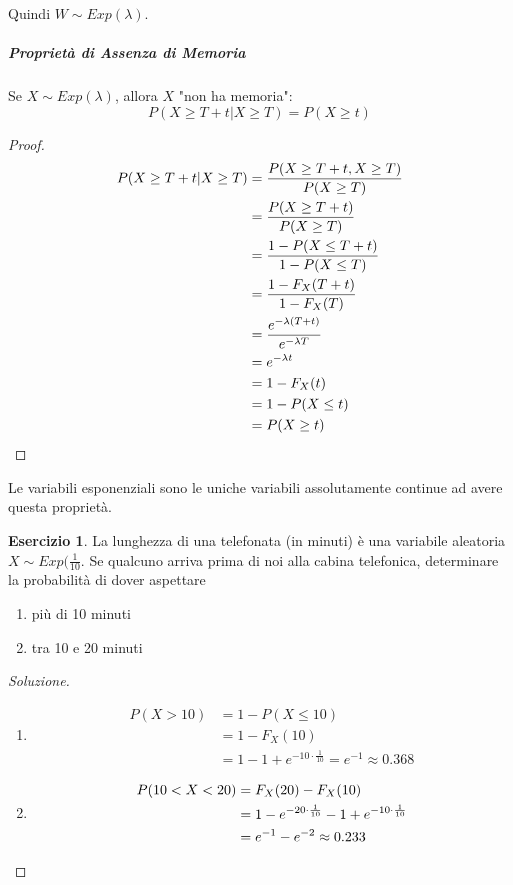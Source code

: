 \documentclass{article}
\theoremstyle{plain}
\theoremstyle{definition}
\newtheorem{esercizio}{Esercizio}[section]
\theoremstyle{remark}
\newenvironment{soluzione}
	{\renewcommand\qedsymbol{$\mathwitch*$}\begin{proof}[Soluzione]}
	{\end{proof}}
\renewcommand{\qedsymbol}{$\mathrightghost$}
\begin{document}
Quindi $W\sim Exp(\lambda)$.
\subparagraph{Proprietà di Assenza di Memoria} %
\label{subp:proprietà_di_assenza_di_memoria}
Se $X\sim Exp(\lambda)$, allora $X$ "non ha memoria":
\begin{equation*}
	P(X\geq T+t|X\geq T)=P(X\geq t)
\end{equation*}
\begin{proof}
	\begin{align*}
		P(X\geq T+t|X\geq T)&=\frac{P(X\geq T+t,X\geq T)}{P(X\geq T)}\\
		&=\frac{P(X\geq T+t)}{P(X\geq T)}\\
		&=\frac{1-P(X\leq T+t)}{1-P(X\leq T)}\\
		&=\frac{1-F_X(T+t)}{1-F_X(T)}\\
		&=\frac{e^{-\lambda (T+t)}}{e^{-\lambda T}}\\
		&=e^{-\lambda t}\\
		&=1-F_X(t)\\
		&=1-P(X\leq t)\\
		&=P(X\geq t)\qedhere
	\end{align*}
\end{proof}
Le variabili esponenziali sono le uniche variabili assolutamente continue ad avere questa proprietà.
\begin{esercizio}
	La lunghezza di una telefonata (in minuti) è una variabile aleatoria $X\sim Exp(\frac{1}{10}$. Se qualcuno arriva prima di noi alla cabina telefonica, determinare la probabilità di dover aspettare
	\begin{enumerate}
		\item più di 10 minuti
		\item tra 10 e 20 minuti
	\end{enumerate}
	\begin{soluzione}
		\begin{enumerate}
			\item 
			\begin{align*}
				P(X>10)&=1-P(X\leq 10)\\
				&=1-F_X(10)\\
				&=1-1+e^{-10\cdot\frac{1}{10}}=e^{-1}\approx 0.368
			\end{align*}
			\item 
			\begin{align*}
				P(10< X< 20)&=F_X(20)-F_X(10)\\
				&=1-e^{-20\cdot\frac{1}{10}}-1+e^{-10\cdot\frac{1}{10}}\\
				&=e^{-1}-e^{-2}\approx 0.233\qedhere
			\end{align*}
		\end{enumerate}
	\end{soluzione}
\end{esercizio}
\end{document}
